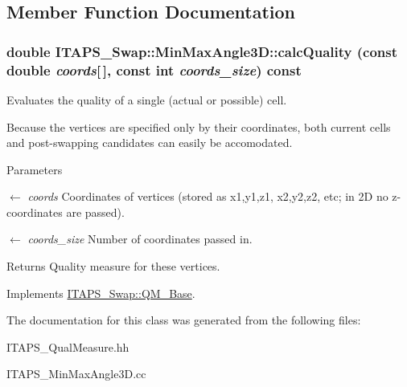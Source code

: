 \subsection{Member Function Documentation}
\hypertarget{class_i_t_a_p_s___swap_1_1_min_max_angle3_d_acad0f614af36012501c3aee66c0e85ea}{
\subsubsection[{calcQuality}]{\setlength{\rightskip}{0pt plus 5cm}double ITAPS\_\-Swap::MinMaxAngle3D::calcQuality (const double {\em coords}\mbox{[}$\,$\mbox{]}, \/  const int {\em coords\_\-size}) const}}
\label{class_i_t_a_p_s___swap_1_1_min_max_angle3_d_acad0f614af36012501c3aee66c0e85ea}


Evaluates the quality of a single (actual or possible) cell. 

Because the vertices are specified only by their coordinates, both current cells and post-\/swapping candidates can easily be accomodated.


\begin{DoxyParams}{Parameters}
\item[\mbox{$\leftarrow$} {\em coords}]Coordinates of vertices (stored as x1,y1,z1, x2,y2,z2, etc; in 2D no z-\/coordinates are passed).\item[\mbox{$\leftarrow$} {\em coords\_\-size}]Number of coordinates passed in.\end{DoxyParams}
\begin{DoxyReturn}{Returns}
Quality measure for these vertices. 
\end{DoxyReturn}


Implements \hyperlink{class_i_t_a_p_s___swap_1_1_q_m___base_aea047b3afc06b75a1115bbaddd8286ee}{ITAPS\_\-Swap::QM\_\-Base}.



The documentation for this class was generated from the following files:\begin{DoxyCompactItemize}
\item 
ITAPS\_\-QualMeasure.hh\item 
ITAPS\_\-MinMaxAngle3D.cc\end{DoxyCompactItemize}
